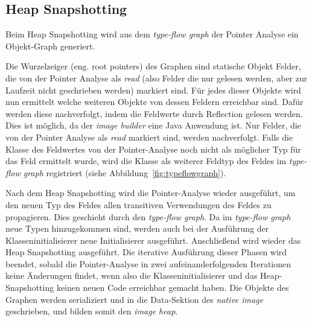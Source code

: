 \subsection{Heap Snapshotting}
\label{subsec:heapsnapshotting}
Beim Heap Snapshotting wird aus dem \textit{type-flow graph} der Pointer Analyse ein Objekt-Graph generiert.

Die Wurzelzeiger (eng. root pointers) des Graphen sind statische Objekt Felder, die von der Pointer Analyse als \textit{read} (also Felder die nur gelesen werden, aber zur Laufzeit nicht geschrieben werden) markiert sind. Für jedes dieser Objekte wird nun ermittelt welche weiteren Objekte von dessen Feldern erreichbar sind. Dafür werden diese nachverfolgt, indem die Feldwerte durch Reflection gelesen werden. Dies ist möglich, da der \textit{image builder} eine Java Anwendung ist. Nur Felder, die von der Pointer Analyse als \textit{read} markiert sind, werden nachverfolgt. Falls die Klasse des Feldwertes von der Pointer-Analyse noch nicht als möglicher Typ für das Feld ermittelt wurde, wird die Klasse als weiterer Feldtyp des Feldes im \textit{type-flow graph} registriert (siehe Abbildung~\ref{fig:typeflowgraph}).

Nach dem Heap Snapshotting wird die Pointer-Analyse wieder ausgeführt, um den neuen Typ des Feldes allen transitiven Verwendungen des Feldes zu propagieren. Dies geschieht durch den \textit{type-flow graph}. Da im \textit{type-flow graph} neue Typen hinzugekommen sind, werden auch bei der Ausführung der Klasseninitialisierer neue Initialisierer ausgeführt. Anschließend wird wieder das Heap Snapshotting ausgeführt. 
Die iterative Ausführung dieser Phasen wird beendet, sobald die Pointer-Analyse in zwei aufeinanderfolgenden Iterationen keine Änderungen findet, wenn also die Klasseninitialisierer und das Heap-Snapshotting keinen neuen Code erreichbar gemacht haben.
Die Objekte des Graphen werden serializiert und in die Data-Sektion des \textit{native image} geschrieben, und bilden somit den \textit{image heap}.
